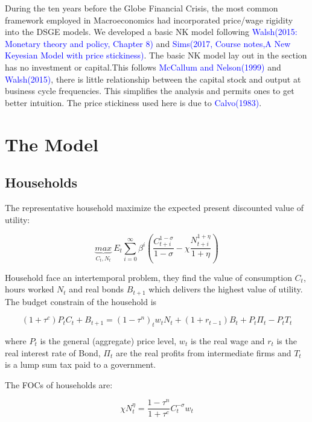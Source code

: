 \documentclass[10pt,math=newtx,citestyle=gb7714-2015,bibstyle=gb7714-2015]{elegantbook}
\begin{document}
{	During the ten years before the Globe Financial Crisis, the most common framework employed in Macroeconomics had incorporated price/wage rigidity into the DSGE models. We developed a basic NK model following \textcolor{blue}{Walsh(2015: Monetary theory and policy, Chapter 8)} and \textcolor{blue}{Sims(2017, Course notes,A New Keyesian Model with price stickiness)}. The basic NK model lay out in the section has no investment or capital.This follows \textcolor{blue}{McCallum and Nelson(1999)} and \textcolor{blue}{Walsh(2015)}, there is little relationship between the capital stock and output at business cycle frequencies. This simplifies the analysis and permits ones to get better intuition. The price stickiness used here is due to \textcolor{blue}{Calvo(1983)}.
	
	\section{The Model}
	\subsection{Households}
	
	The representative household maximize the expected present discounted value of utility:
	
	\begin{equation}
		\underbrace{max}_{C_t,N_t}~E_t \sum_{i=0}^{\infty}\beta^i\left(\frac{C_{t+i}^{1-\sigma}}{1-\sigma}-\chi \frac{N_{t+i}^{1+\eta}}{1+\eta}\right)
	\end{equation}
	
	Household face an intertemporal problem, they find the value of consumption $C_t$, hours worked $N_t$ and real bonds $B_{t+1}$ which delivers the highest value of utility. The budget constrain of the household is
	
	\begin{equation}
		(1+\tau^c)P_tC_t+B_{t+1}=(1-\tau^n)_tw_tN_t+(1+r_{t-1})B_t+P_t\Pi_t-P_tT_t
	\end{equation}
	
	where $P_t$ is the general (aggregate) price level, $w_t$ is the real wage and $r_t$ is the real interest rate of Bond, $\Pi_t$ are the real profits from intermediate firms and $T_t$ is a lump sum tax paid to a government.
	
	The FOCs of households are:
	
	\begin{equation}
		\chi N_t^{\eta}=\frac{1-\tau^n}{1+\tau^c}C_t^{-\sigma}w_t
	\end{equation}
	
}
\end{document}
